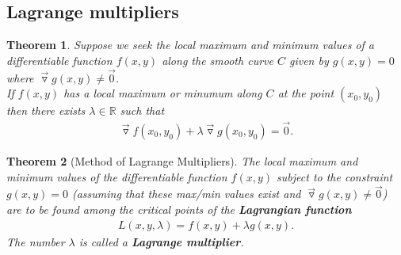 \documentclass{article}
\theoremstyle{sltheorem}
\newtheorem{theorem}{Theorem}[section]
\newcommand{\R}{\mathbb{R}}
\newcommand{\grad}{\vec\triangledown}
\newcommand*\B[1]{\textbf{#1}}
\begin{document}
\subsection{Lagrange multipliers}
\begin{theorem}
    Suppose we seek the local maximum and minimum values of a differentiable
    function $f(x,y)$ along the smooth curve $C$ given by $g(x,y)=0$ where
    $\grad g(x,y)\not=\vec 0$.\\
    If $f(x,y)$ has a local maximum or minumum along $C$ at the point
    $(x_0, y_0)$ then there exists $\lambda\in\R$ such that
    \begin{align*}
        \grad f(x_0, y_0) + \lambda\grad g(x_0, y_0) = \vec 0.
    \end{align*}
\end{theorem}
\begin{theorem}[Method of Lagrange Multipliers]
    The local maximum and minimum values of the differentiable function
    $f(x,y)$ subject to the constraint $g(x,y)=0$ (assuming that these
    max/min values exist and $\grad g(x,y)\not=\vec 0$) are to be found
    among the critical points of the \B{Lagrangian function}
    \begin{align*}
        L(x,y,\lambda)=f(x,y)+\lambda g(x,y).
    \end{align*} 
    The number $\lambda$ is called a \B{Lagrange multiplier}.
\end{theorem}
\end{document}
